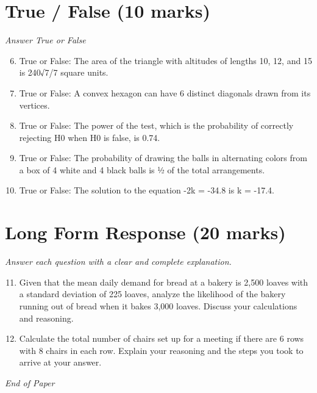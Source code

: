 \documentclass[12pt]{article}
\begin{document}
\section*{True / False (10 marks)}
\textit{Answer True or False}
\begin{enumerate}[label=\arabic*.]
\setcounter{enumi}{5}
\item True or False: The area of the triangle with altitudes of lengths 10, 12, and 15 is 240√7/7 square units.
\item True or False: A convex hexagon can have 6 distinct diagonals drawn from its vertices.
\item True or False: The power of the test, which is the probability of correctly rejecting H0 when H0 is false, is 0.74.
\item True or False: The probability of drawing the balls in alternating colors from a box of 4 white and 4 black balls is ½ of the total arrangements.
\item True or False: The solution to the equation -2k = -34.8 is k = -17.4.
\end{enumerate}

\section*{Long Form Response (20 marks)}
\textit{Answer each question with a clear and complete explanation.}
\begin{enumerate}[label=\arabic*.]
\setcounter{enumi}{10}
\item Given that the mean daily demand for bread at a bakery is 2,500 loaves with a standard
deviation of 225 loaves, analyze the likelihood of the bakery running out of bread when it
bakes 3,000 loaves. Discuss your calculations and reasoning.
\item Calculate the total number of chairs set up for a meeting if there are 6 rows with 8
chairs in each row. Explain your reasoning and the steps you took to arrive at your
answer.
\end{enumerate}

\vfill
\noindent\textit{End of Paper}
\end{document}
